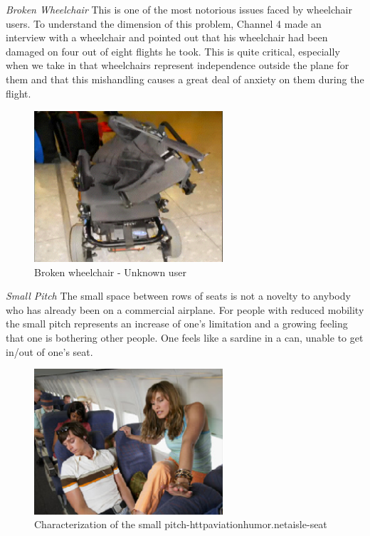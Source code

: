 \emph{Broken Wheelchair} This is one of the most notorious issues faced by wheelchair users. To understand the dimension of this problem, Channel 4 made an interview with a wheelchair and pointed out that his wheelchair had been damaged on four out of eight flights he took. This is quite critical, especially when we take in that wheelchairs represent independence outside the plane for them and that this mishandling causes a great deal of anxiety on them during the flight.  \\
 
\begin{figure}[h]
\centering
\includegraphics[width=7cm]{brazil_images/image001.png}
\caption{Broken wheelchair - Unknown user}
\label{fig:broken_wheelchair}
\end{figure}


\emph{Small Pitch} The small space between rows of seats is not a novelty to anybody who has already been on a commercial airplane. For people with reduced mobility the small pitch represents an increase of one’s limitation and a growing feeling that one is bothering other people. One feels like a sardine in a can, unable to get in/out of one’s seat. \\

\begin{figure}[h]
\centering
\includegraphics[width=7cm]{brazil_images/image002.png}
\caption{Characterization of the small pitch-httpaviationhumor.netaisle-seat}
\label{fig:broken_wheelchair}
\end{figure}


